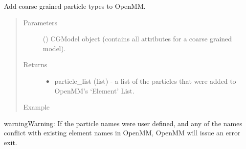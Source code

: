 \documentclass[letterpaper,12pt,english,openany,oneside]{sphinxmanual}
\begin{document}
\label{\detokenize{build:module-build.cg_build}}

\begin{fulllineitems}
\label{\detokenize{build:build.cg_build.add_new_elements}}
Add coarse grained particle types to OpenMM.
\begin{quote}\begin{description}
\item[{Parameters}] \leavevmode
{} () \textendash{} CGModel object (contains all attributes for a coarse grained model).

\item[{Returns}] \leavevmode
\begin{itemize}
\item {} 
particle\_list (list) - a list of the particles that were added to OpenMM’s ‘Element’ List.

\end{itemize}


\item[{Example}] \leavevmode
\end{description}\end{quote}

\begin{sphinxVerbatim}[commandchars=\\\{\}]
   
  
  
\end{sphinxVerbatim}

\begin{sphinxadmonition}{warning}{Warning:}
If the particle names were user defined, and any of the names conflict with existing element names in OpenMM, OpenMM will issue an error exit.
\end{sphinxadmonition}

\end{fulllineitems}
\end{document}
